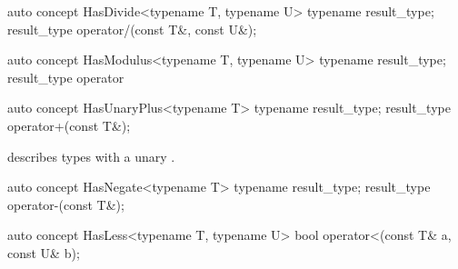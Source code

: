 \documentclass[american,twoside]{book}
\begin{document}
\begin{itemdescr}
\pnum
{}
\end{itemdescr}

\begin{itemdecl}
auto concept HasDivide<typename T, typename U> {
  typename result_type;
  result_type operator/(const T&, const U&);
}
\end{itemdecl}

\begin{itemdescr}
\pnum
{}
\end{itemdescr}

\begin{itemdecl}
auto concept HasModulus<typename T, typename U> {
  typename result_type;
  result_type operator%
}
\end{itemdecl}

\begin{itemdescr}
\pnum
{}
\end{itemdescr}

\begin{itemdecl}
auto concept HasUnaryPlus<typename T> {
  typename result_type;
  result_type operator+(const T&);
}
\end{itemdecl}

\begin{itemdescr}
\pnum
\mbox{\reallynote} describes types with a unary \mbox{}.
\end{itemdescr}

\begin{itemdecl}
auto concept HasNegate<typename T> {
  typename result_type;
  result_type operator-(const T&);
}
\end{itemdecl}

\begin{itemdescr}
\pnum
{}
\end{itemdescr}

\begin{itemdecl}
auto concept HasLess<typename T, typename U> {
  bool operator<(const T& a, const U& b);
}
\end{itemdecl}

\begin{itemdescr}
\pnum
{}
\end{itemdescr}
\end{document}
